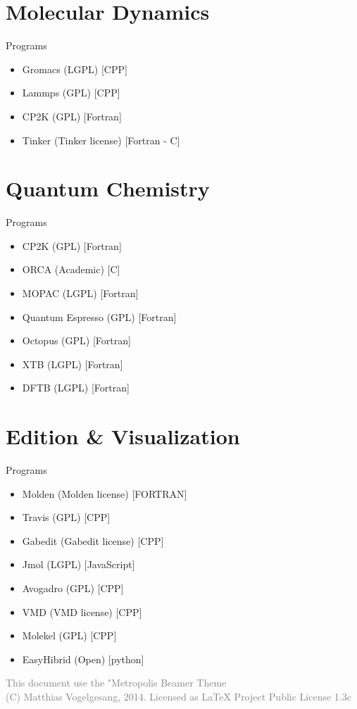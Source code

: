 \documentclass[10pt]{beamer}
\begin{document}
\section[Dynamics]{Molecular Dynamics}

\begin{frame}[fragile]{Programs}
	\begin{itemize}
	    \item Gromacs (LGPL) [CPP]
        \item Lammps (GPL) [CPP]
        \item CP2K (GPL) [Fortran]
        \item Tinker (Tinker license) [Fortran - C]
    \end{itemize}
\end{frame}

\section[Quantum]{Quantum Chemistry}

\begin{frame}[fragile]{Programs}
  \begin{itemize}
      \item CP2K (GPL) [Fortran]
      \item ORCA (Academic) [C]
      \item MOPAC (LGPL) [Fortran]
      \item Quantum Espresso (GPL) [Fortran]
      \item Octopus (GPL) [Fortran]
      \item XTB (LGPL) [Fortran]
      \item DFTB (LGPL) [Fortran]
  \end{itemize}
\end{frame}


\section[Edit]{Edition \& Visualization}

\begin{frame}[fragile]{Programs}
  \begin{itemize}
      \item Molden (Molden license) [FORTRAN]
      \item Travis (GPL) [CPP]
      \item Gabedit (Gabedit license) [CPP]
      \item Jmol (LGPL) [JavaScript]
      \item Avogadro (GPL) [CPP]
      \item VMD (VMD license) [CPP]
      \item Molekel (GPL) [CPP]
      \item EasyHibrid (Open) [python]
  \end{itemize}
\end{frame}

\begin{frame}
    \textcolor{gray}{This document use the "Metropolis Beamer Theme\\
    (C) Matthias Vogelgesang, 2014. Licensed as LaTeX Project Public License 1.3c }
\end{frame}
\end{document}
